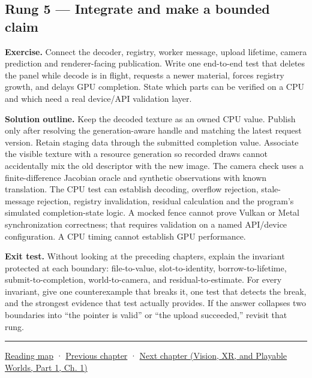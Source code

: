\subsection{Rung 5 --- Integrate and make a bounded claim}\label{02-foundations-ii-ch038-rung-5-integrate-and-make-a-bounded-claim}

\hypertarget{02-foundations-ii-ch038-rung-5-integrate-and-make-a-bounded-claim}{}

\textbf{Exercise.} Connect the decoder, registry, worker message, upload lifetime, camera prediction and renderer-facing publication. Write one end-to-end test that deletes the panel while decode is in flight, requests a newer material, forces registry growth, and delays GPU completion. State which parts can be verified on a CPU and which need a real device/API validation layer.

\textbf{Solution outline.} Keep the decoded texture as an owned CPU value. Publish only after resolving the generation-aware handle and matching the latest request version. Retain staging data through the submitted completion value. Associate the visible texture with a resource generation so recorded draws cannot accidentally mix the old descriptor with the new image. The camera check uses a finite-difference Jacobian oracle and synthetic observations with known translation. The CPU test can establish decoding, overflow rejection, stale-message rejection, registry invalidation, residual calculation and the program's simulated completion-state logic. A mocked fence cannot prove Vulkan or Metal synchronization correctness; that requires validation on a named API/device configuration. A CPU timing cannot establish GPU performance.

\textbf{Exit test.} Without looking at the preceding chapters, explain the invariant protected at each boundary: file-to-value, slot-to-identity, borrow-to-lifetime, submit-to-completion, world-to-camera, and residual-to-estimate. For every invariant, give one counterexample that breaks it, one test that detects the break, and the strongest evidence that test actually provides. If the answer collapses two boundaries into ``the pointer is valid'' or ``the upload succeeded,'' revisit that rung.

\begin{center}\rule{0.5\linewidth}{0.5pt}\end{center}

\hyperref[volume-reading-map]{Reading map} · \hyperref[02-foundations-ii-ch037-camera-contracts-and-transform-chain-debugging]{Previous chapter} · \href{../07-Vision-XR-and-Playable-Worlds-P01/main.pdf\#nameddest=02-foundations-ii-ch039-research-navigation-and-source-boundaries}{Next chapter (Vision, XR, and Playable Worlds, Part 1, Ch. 1)}

